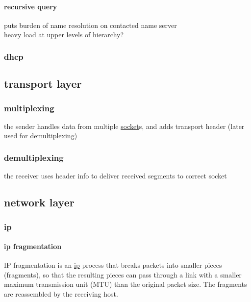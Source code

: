 \documentclass[a4paper,12pt]{article}
\begin{document}
\paragraph{recursive query}
\label{sec:org9bbf83d}
puts burden of name resolution on contacted name server\\
heavy load at upper levels of hierarchy?\\
\subsubsection{dhcp}
\label{sec:org6cea669}
\subsection{transport layer}
\label{sec:orgb52cc4c}
\subsubsection{multiplexing}
\label{sec:orgb5b3039}
the sender handles data from multiple \hyperref[sec:orgc3ed321]{socket}s, and adds transport header (later used for \hyperref[sec:org12c1e9e]{demultiplexing})\\
\subsubsection{demultiplexing}
\label{sec:org12c1e9e}
the receiver uses header info to deliver received segments to correct socket\\
\subsection{network layer}
\label{sec:orga665e5f}
\subsubsection{ip}
\label{sec:org07a120e}
\paragraph{ip fragmentation}
\label{sec:org989a53c}
IP fragmentation is an \hyperref[sec:org07a120e]{ip} process that breaks packets into smaller pieces (fragments), so that the resulting pieces can pass through a link with a smaller maximum transmission unit (MTU) than the original packet size. The fragments are reassembled by the receiving host.\\
\end{document}
